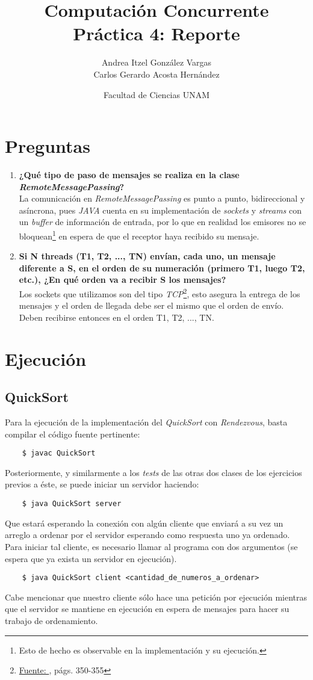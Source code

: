\documentclass[12pt]{article}
\title{Computación Concurrente \\ Práctica 4: Reporte}
\author{Andrea Itzel González Vargas\\Carlos Gerardo Acosta Hernández}
\date{Facultad de Ciencias UNAM}
\begin{document}
\maketitle
\section{Preguntas}
\begin{enumerate}[label=(\alph*)]
\item \textbf{¿Qué tipo de paso de mensajes se realiza en la clase \textit{RemoteMessagePassing}?}\\
  La comunicación en \textit{RemoteMessagePassing} es punto a punto, bidireccional y asíncrona, pues \textit{JAVA} cuenta en su
  implementación de \textit{sockets} y \textit{streams} con un \textit{buffer} de información de entrada, por lo que en realidad los emisores no se bloquean\footnote{Esto de hecho es observable en la implementación y su ejecución.} en espera de que el receptor haya recibido su mensaje.
 \item \textbf{Si N threads (T1, T2, ..., TN) envían, cada uno, un mensaje diferente a S, en el orden de su numeración (primero T1, luego T2, etc.), ¿En qué orden va a recibir S los mensajes?}\\
   Los sockets que utilizamos son del tipo \textit{TCP}\footnote{\href{http://www.buyya.com/java/Chapter13.pdf}{Fuente: }, págs. 350-355}, esto asegura la entrega de los mensajes y el orden de llegada debe ser el mismo que el orden de envío. Deben recibirse entonces en el orden T1, T2, ..., TN.
\end{enumerate}

\section{Ejecución}
\subsection{QuickSort}
Para la ejecución de la implementación del \textit{QuickSort} con \textit{Rendezvous}, basta
compilar el código fuente pertinente:
\begin{verbatim}
    $ javac QuickSort
\end{verbatim}
Posteriormente, y similarmente a los \textit{tests} de las otras dos clases de los ejercicios previos
a éste, se puede iniciar un servidor haciendo:
\begin{verbatim}
    $ java QuickSort server
\end{verbatim}
Que estará esperando la conexión con algún cliente que enviará a su vez un arreglo a ordenar por el
servidor esperando como respuesta uno ya ordenado.
Para iniciar tal cliente, es necesario llamar al programa con dos argumentos (se espera que ya exista un servidor en ejecución).
\begin{verbatim}
    $ java QuickSort client <cantidad_de_numeros_a_ordenar>
\end{verbatim}
Cabe mencionar que nuestro cliente sólo hace una petición por ejecución mientras que el servidor se mantiene en ejecución en espera de mensajes para hacer su trabajo de ordenamiento.
\end{document}
